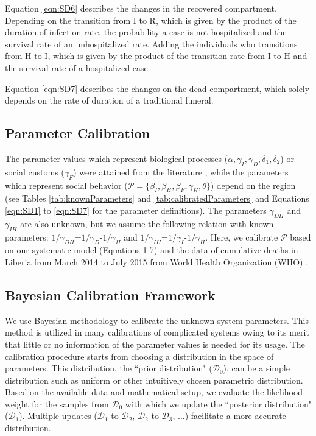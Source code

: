 Equation \ref{eqn:SD6} describes the changes in the recovered compartment. Depending on the transition from I to R, which is given by the product of the duration of infection rate, the probability a case is not hospitalized and the survival rate of an unhospitalized rate. Adding  the individuals who transitions from H to I, which is given by the product of the transition rate from I to H and the survival rate of a hospitalized case.

Equation \ref{eqn:SD7} describes the changes on the dead compartment, which solely depends on the rate of duration of a traditional funeral.





\subsection{Parameter Calibration}

The parameter values which represent biological processes ($\alpha, \gamma_{I}, \gamma_{D}, \delta_{1}, \delta_{2}$) or social customs ($\gamma_{F}$) were attained from the literature \cite{Poletto2014, Webb2015}, while the parameters which represent social behavior ($\mathcal{P}=\{\beta_{I}, \beta_{H}, \beta_{F}, \gamma_{H}, \theta\}$) depend on the region (see Tables \ref{tab:knownParameters} and \ref{tab:calibratedParameters} and Equations \ref{eqn:SD1} to \ref{eqn:SD7} for the parameter definitions). The parameters $\gamma_{DH}$ and $\gamma_{IH}$ are also unknown, but we assume the following relation with known parameters: $1/\gamma_{DH}$=$1/\gamma_{D}$-$1/\gamma_{H}$ and $1/\gamma_{IH}$=$1/\gamma_{I}$-$1/\gamma_{H}$. Here, we calibrate $\mathcal{P}$ based on our systematic model (Equations 1-7) and the data of cumulative deaths in Liberia from March 2014 to July 2015 from World Health Organization (WHO) \cite{CDCData}.


\subsection{Bayesian Calibration Framework}
We use Bayesian methodology to calibrate the unknown system parameters. This method is utilized in many calibrations of complicated systems owing to its merit that little or no information of the parameter values is needed for its usage. The calibration procedure starts from choosing a distribution in the space of parameters. This distribution, the ``prior distribution" ($\mathcal{D}_0$), can be a simple distribution such as uniform or other intuitively chosen parametric distribution. Based on the available data and mathematical setup, we evaluate the likelihood weight for the samples from $\mathcal{D}_0$ with which we update the ``posterior distribution" ($\mathcal{D}_1$). Multiple updates ($\mathcal{D}_1$ to $\mathcal{D}_2$, $\mathcal{D}_2$ to $\mathcal{D}_3$, ...) facilitate a more accurate distribution.

